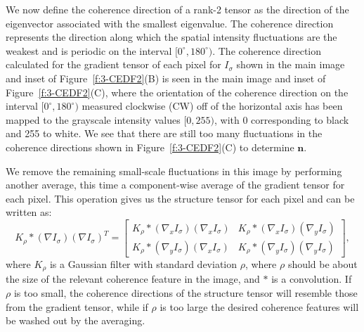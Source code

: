 We now define the coherence direction of a rank-2 tensor as the direction of the eigenvector associated with the smallest eigenvalue.
The coherence direction represents the direction along which the spatial intensity fluctuations are the weakest and is periodic on the interval $[0^{\circ}, 180^{\circ})$.
The coherence direction calculated for the gradient tensor of each pixel for $I_\sigma$ shown in the main image and inset of Figure~\ref{f:3-CEDF2}(B) is seen in the main image and inset of Figure~\ref{f:3-CEDF2}(C), where the orientation of the coherence direction on the interval $[0^{\circ}, 180^{\circ})$ measured clockwise (CW) off of the horizontal axis has been mapped to the grayscale intensity values $[0,255)$, with 0 corresponding to black and 255 to white.
We see that there are still too many fluctuations in the coherence directions shown in Figure~\ref{f:3-CEDF2}(C) to determine $\mathbf{n}$.

We remove the remaining small-scale fluctuations in this image by performing another average, this time a component-wise average of the gradient tensor for each pixel.
This operation gives us the structure tensor for each pixel and can be written as:
\begin{equation}
K_{\rho} \ast (\nabla I_{\sigma})(\nabla I_{\sigma})^T =
\begin{bmatrix}
K_{\rho} \ast ( \nabla_x I_{\sigma})(\nabla_x I_{\sigma}) & K_{\rho} \ast (\nabla_x I_{\sigma})(\nabla_y I_{\sigma}) \\
K_{\rho} \ast (  \nabla_y I_{\sigma})(\nabla_x I_{\sigma}) & K_{\rho} \ast (\nabla_y I_{\sigma})(\nabla_y I_{\sigma})
\end{bmatrix},
\end{equation}
where $K_{\rho}$ is a Gaussian filter with standard deviation $\rho$, where $\rho$ should be about the size of the relevant coherence feature in the image, and $\ast$ is a convolution.
If $\rho$ is too small, the coherence directions of the structure tensor will resemble those from the gradient tensor, while if $\rho$ is too large the desired coherence features will be washed out by the averaging.

